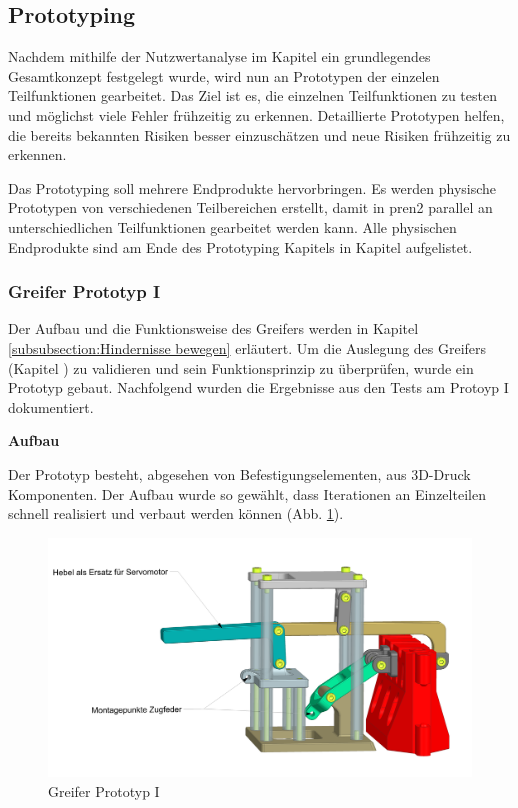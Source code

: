 \subsection*{Prototyping}\label{prototyping}


Nachdem mithilfe der Nutzwertanalyse im Kapitel  ein grundlegendes Gesamtkonzept festgelegt wurde, wird nun an Prototypen der einzelen Teilfunktionen gearbeitet. Das Ziel ist es, die einzelnen Teilfunktionen zu testen und möglichst viele Fehler frühzeitig zu erkennen. Detaillierte Prototypen helfen, die bereits bekannten Risiken besser einzuschätzen und neue Risiken frühzeitig zu erkennen.

Das Prototyping soll mehrere Endprodukte hervorbringen. Es werden physische Prototypen von verschiedenen Teilbereichen erstellt, damit in \acrshort{pren2} parallel an unterschiedlichen Teilfunktionen gearbeitet werden kann. Alle physischen Endprodukte sind am Ende des Prototyping Kapitels in Kapitel  aufgelistet.

\subsubsection*{Greifer Prototyp I}
\label{subsubsection:gripper-prototype-1}



Der Aufbau und die Funktionsweise des Greifers werden in Kapitel \ref{subsubsection:Hindernisse bewegen} erläutert. Um die Auslegung des Greifers (Kapitel ) zu validieren und sein Funktionsprinzip zu überprüfen, wurde ein Prototyp gebaut. Nachfolgend wurden die Ergebnisse aus den Tests am Protoyp I dokumentiert.

\textbf{Aufbau}

 Der Prototyp besteht, abgesehen von Befestigungselementen, aus 3D-Druck Komponenten. Der Aufbau wurde so gewählt, dass Iterationen an Einzelteilen schnell realisiert und verbaut werden können (Abb. \ref{fig:gripper-prototype-1-trimetric-notes}). 

\begin{figure}[H]
\centering
\includegraphics[width=1.0\textwidth]{assets/greifer-prototyp/Greifer_Trimetrisch_Notes.png}
\caption{Greifer Prototyp I}
\label{fig:gripper-prototype-1-trimetric-notes}
\end{figure}

